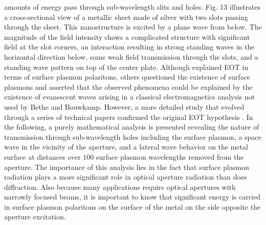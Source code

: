 \documentclass[11pt]{article}
\begin{document}
amounts of energy pass through sub-wavelength slits and holes. Fig. 13 illustrates a cross-sectional view of a metallic sheet made of silver with two slots passing through the sheet. This nanostructure is excited by a plane wave from below. The magnitude of the field intensity shows a complicated structure with significant field at the slot corners, an interaction resulting in strong standing waves in the horizontal direction below, some weak field transmission through the slots, and a standing wave pattern on top of the center plate.
Although \cite{Ebbesen1998} explained EOT in terms of surface plasmon polaritons, others \cite{Lezec2004,Gay2006} questioned the existence of surface plasmons and asserted that the observed phenomena could be explained by the existence of evanescent waves arising in a classical electromagnetics analysis not used by Bethe and Bouwkamp. However, a more detailed study that evolved through a series of technical papers confirmed the original EOT hypothesis \cite{Lalanne2006,Nevels2014}. In the following, a purely mathematical analysis is presented revealing the nature of transmission through sub-wavelength holes including the surface plasmon, a space wave in the vicinity of the aperture, and a lateral wave behavior on the metal surface at distances over $100$ surface plasmon wavelengths removed from the aperture. The importance of this analysis lies in the fact that surface plasmon radiation plays a more significant role in optical aperture radiation than does diffraction. Also because many applications require optical apertures with narrowly focused beams, it is important to know that significant energy is carried in surface plasmon polaritons on the surface of the metal on the side opposite the aperture excitation.
\end{document}
